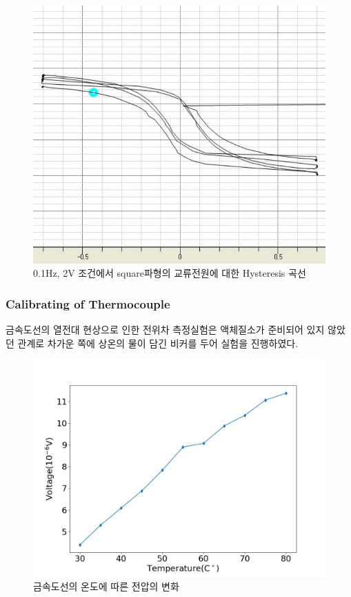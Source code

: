 \documentclass[aps,reprint,superscriptaddress,10pt]{revtex4-2}
\begin{document}
\begin{figure}[htbp]
  \centering
  \includegraphics[scale = 0.2]{square,0.1,2.png}
  \caption{0.1Hz, 2V 조건에서 square파형의 교류전원에 대한 Hysteresis 곡선}
  \label{fig:square,0.1,2}
\end{figure}

\subsubsection{Calibrating of Thermocouple}
금속도선의 열전대 현상으로 인한 전위차 측정실험은 액체질소가 준비되어 있지 않았던
관계로 차가운 쪽에 상온의 물이 담긴 비커를 두어 실험을 진행하였다.
\begin{figure}[htbp]
  \centering
  \includegraphics[scale = 0.3]{1124.png}
  \caption{금속도선의 온도에 따른 전압의 변화}
  \label{fig:1124}
\end{figure}
\end{document}
